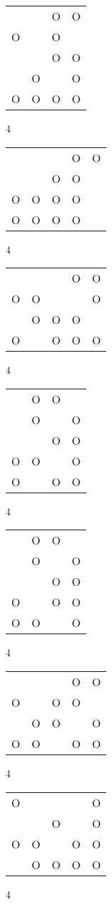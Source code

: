 \begin{tabular}{|m{0.2cm}m{0.2cm}m{0.2cm}m{0.2cm}|}\hline
 & &O&O\\
O& &O& \\
 & &O&O\\
 &O& &O\\
O&O&O&O\\
\hline\end{tabular}4
\begin{tabular}{|m{0.2cm}m{0.2cm}m{0.2cm}m{0.2cm}m{0.2cm}|}\hline
 & & &O&O\\
 & &O&O& \\
O&O&O&O& \\
O&O&O&O& \\
\hline\end{tabular}4
\begin{tabular}{|m{0.2cm}m{0.2cm}m{0.2cm}m{0.2cm}m{0.2cm}|}\hline
 & & &O&O\\
O&O& & &O\\
 &O&O&O& \\
O& &O&O&O\\
\hline\end{tabular}4
\begin{tabular}{|m{0.2cm}m{0.2cm}m{0.2cm}m{0.2cm}|}\hline
 &O&O& \\
 &O& &O\\
 & &O&O\\
O&O& &O\\
O& &O&O\\
\hline\end{tabular}4
\begin{tabular}{|m{0.2cm}m{0.2cm}m{0.2cm}m{0.2cm}|}\hline
 &O&O& \\
 &O& &O\\
 & &O&O\\
O& &O&O\\
O&O& &O\\
\hline\end{tabular}4
\begin{tabular}{|m{0.2cm}m{0.2cm}m{0.2cm}m{0.2cm}m{0.2cm}|}\hline
 & & &O&O\\
O& &O&O& \\
 &O&O& &O\\
O&O& &O&O\\
\hline\end{tabular}4
\begin{tabular}{|m{0.2cm}m{0.2cm}m{0.2cm}m{0.2cm}m{0.2cm}|}\hline
O& & & &O\\
 & &O& &O\\
O&O& &O&O\\
 &O&O&O&O\\
\hline\end{tabular}4
